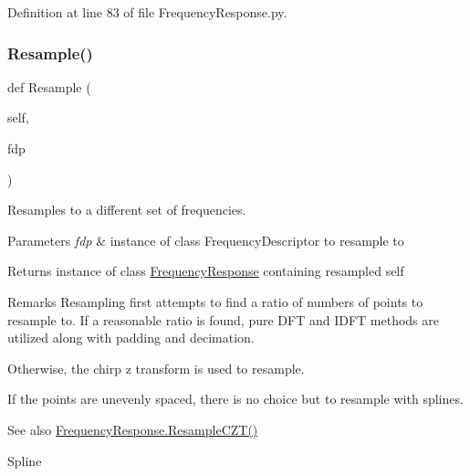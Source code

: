 Definition at line 83 of file Frequency\+Response.\+py.

\mbox{\label{classSignalIntegrity_1_1FrequencyDomain_1_1FrequencyResponse_1_1FrequencyResponse_a6aa7e8bdecb4f17e41d783d00a27fdd8}} 
\subsubsection{\texorpdfstring{Resample()}{Resample()}}
{\footnotesize\ttfamily def Resample (\begin{DoxyParamCaption}\item[{}]{self,  }\item[{}]{fdp }\end{DoxyParamCaption})}



Resamples to a different set of frequencies. 


\begin{DoxyParams}{Parameters}
{\em fdp} & instance of class Frequency\+Descriptor to resample to \\
\hline
\end{DoxyParams}
\begin{DoxyReturn}{Returns}
instance of class \hyperlink{classSignalIntegrity_1_1FrequencyDomain_1_1FrequencyResponse_1_1FrequencyResponse}{Frequency\+Response} containing resampled self 
\end{DoxyReturn}
\begin{DoxyRemark}{Remarks}
Resampling first attempts to find a ratio of numbers of points to resample to. If a reasonable ratio is found, pure D\+FT and I\+D\+FT methods are utilized along with padding and decimation.
\end{DoxyRemark}
Otherwise, the chirp z transform is used to resample.

If the points are unevenly spaced, there is no choice but to resample with splines.

\begin{DoxySeeAlso}{See also}
\hyperlink{classSignalIntegrity_1_1FrequencyDomain_1_1FrequencyResponse_1_1FrequencyResponse_af61ffacaaef319b5b0752778bfe522e6}{Frequency\+Response.\+Resample\+C\+Z\+T()} 

Spline 
\end{DoxySeeAlso}


